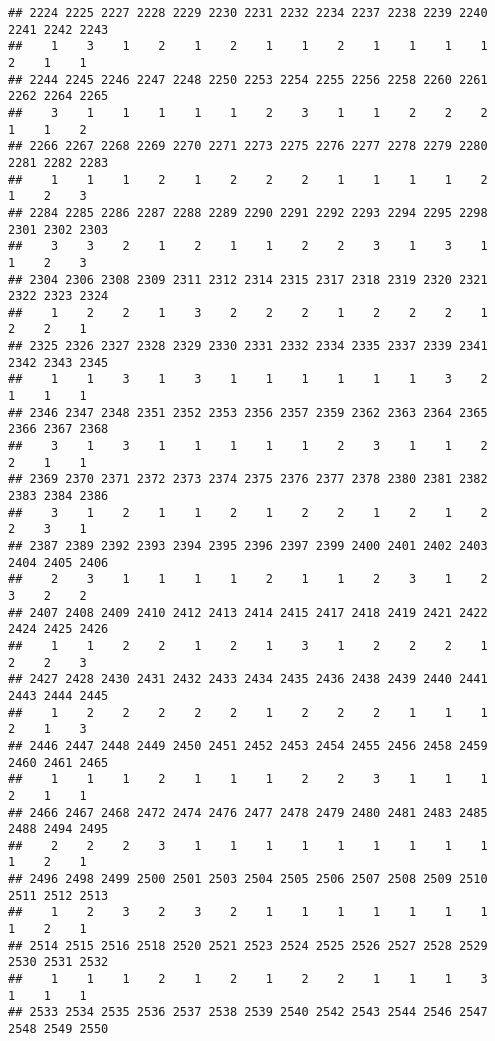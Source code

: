 \documentclass[
]{article}
\begin{document}
\begin{verbatim}
## 2224 2225 2227 2228 2229 2230 2231 2232 2234 2237 2238 2239 2240 2241 2242 2243 
##    1    3    1    2    1    2    1    1    2    1    1    1    1    2    1    1 
## 2244 2245 2246 2247 2248 2250 2253 2254 2255 2256 2258 2260 2261 2262 2264 2265 
##    3    1    1    1    1    1    2    3    1    1    2    2    2    1    1    2 
## 2266 2267 2268 2269 2270 2271 2273 2275 2276 2277 2278 2279 2280 2281 2282 2283 
##    1    1    1    2    1    2    2    2    1    1    1    1    2    1    2    3 
## 2284 2285 2286 2287 2288 2289 2290 2291 2292 2293 2294 2295 2298 2301 2302 2303 
##    3    3    2    1    2    1    1    2    2    3    1    3    1    1    2    3 
## 2304 2306 2308 2309 2311 2312 2314 2315 2317 2318 2319 2320 2321 2322 2323 2324 
##    1    2    2    1    3    2    2    2    1    2    2    2    1    2    2    1 
## 2325 2326 2327 2328 2329 2330 2331 2332 2334 2335 2337 2339 2341 2342 2343 2345 
##    1    1    3    1    3    1    1    1    1    1    1    3    2    1    1    1 
## 2346 2347 2348 2351 2352 2353 2356 2357 2359 2362 2363 2364 2365 2366 2367 2368 
##    3    1    3    1    1    1    1    1    2    3    1    1    2    2    1    1 
## 2369 2370 2371 2372 2373 2374 2375 2376 2377 2378 2380 2381 2382 2383 2384 2386 
##    3    1    2    1    1    2    1    2    2    1    2    1    2    2    3    1 
## 2387 2389 2392 2393 2394 2395 2396 2397 2399 2400 2401 2402 2403 2404 2405 2406 
##    2    3    1    1    1    1    2    1    1    2    3    1    2    3    2    2 
## 2407 2408 2409 2410 2412 2413 2414 2415 2417 2418 2419 2421 2422 2424 2425 2426 
##    1    1    2    2    1    2    1    3    1    2    2    2    1    2    2    3 
## 2427 2428 2430 2431 2432 2433 2434 2435 2436 2438 2439 2440 2441 2443 2444 2445 
##    1    2    2    2    2    2    1    2    2    2    1    1    1    2    1    3 
## 2446 2447 2448 2449 2450 2451 2452 2453 2454 2455 2456 2458 2459 2460 2461 2465 
##    1    1    1    2    1    1    1    2    2    3    1    1    1    2    1    1 
## 2466 2467 2468 2472 2474 2476 2477 2478 2479 2480 2481 2483 2485 2488 2494 2495 
##    2    2    2    3    1    1    1    1    1    1    1    1    1    1    2    1 
## 2496 2498 2499 2500 2501 2503 2504 2505 2506 2507 2508 2509 2510 2511 2512 2513 
##    1    2    3    2    3    2    1    1    1    1    1    1    1    1    2    1 
## 2514 2515 2516 2518 2520 2521 2523 2524 2525 2526 2527 2528 2529 2530 2531 2532 
##    1    1    1    2    1    2    1    2    2    1    1    1    3    1    1    1 
## 2533 2534 2535 2536 2537 2538 2539 2540 2542 2543 2544 2546 2547 2548 2549 2550 

\end{verbatim}
\end{document}
